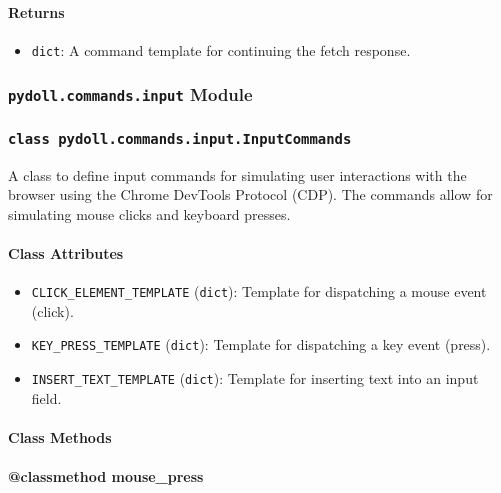 \documentclass{article}
\begin{document}
\paragraph{Returns}

\begin{itemize}
    \item \lstinline[style=pythonstyle]|dict|: A command template for continuing the fetch response.
\end{itemize}

\subsubsection*{\texttt{pydoll.commands.input} Module}

\subsubsection*{\texttt{class pydoll.commands.input.InputCommands}}
\noindent A class to define input commands for simulating user interactions with the browser using the Chrome DevTools Protocol (CDP). The commands allow for simulating mouse clicks and keyboard presses.

\paragraph{Class Attributes}

\begin{itemize}
    \item \lstinline[style=pythonstyle]|CLICK_ELEMENT_TEMPLATE| (\lstinline[style=pythonstyle]|dict|): Template for dispatching a mouse event (click).
    \item \lstinline[style=pythonstyle]|KEY_PRESS_TEMPLATE| (\lstinline[style=pythonstyle]|dict|): Template for dispatching a key event (press).
    \item \lstinline[style=pythonstyle]|INSERT_TEXT_TEMPLATE| (\lstinline[style=pythonstyle]|dict|): Template for inserting text into an input field.
\end{itemize}

\paragraph{Class Methods}
\paragraph{@classmethod mouse\_press}
\end{document}
